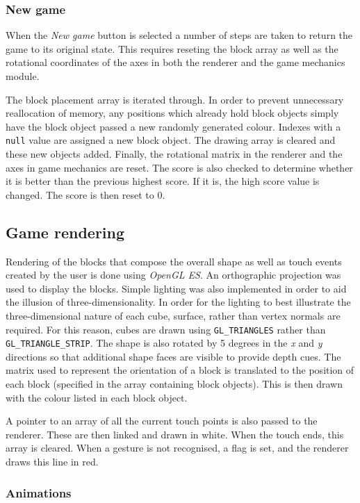 \subsubsection{New game}
When the \emph{New game} button is selected a number of steps are taken to return the game to its original state. This requires reseting the block array as well as the rotational coordinates of the axes in both the renderer and the game mechanics module.

The block placement array is iterated through. In order to prevent unnecessary reallocation of memory, any positions which already hold block objects simply have the block object passed a new randomly generated colour. Indexes with a \texttt{null} value are assigned a new block object. The drawing array is cleared and these new objects added. Finally, the rotational matrix in the renderer and the axes in game mechanics are reset. The score is also checked to determine whether it is better than the previous highest score. If it is, the high score value is changed. The score is then reset to 0. 


\subsection{Game rendering}
Rendering of the blocks that compose the overall shape as well as touch events created by the user is done using \emph{OpenGL ES}. An orthographic projection was used to display the blocks. Simple lighting was also implemented in order to aid the illusion of three-dimensionality. In order for the lighting to best illustrate the three-dimensional nature of each cube, surface, rather than vertex normals are required. For this reason, cubes are drawn using \texttt{GL\_TRIANGLES} rather than \texttt{GL\_TRIANGLE\_STRIP}. The shape is also rotated by 5 degrees in the \emph{x} and \emph{y} directions so that additional shape faces are visible to provide depth cues. The matrix used to represent the orientation of a block is translated to the position of each block (specified in the array containing block objects). This is then drawn with the colour listed in each block object. 

A pointer to an array of all the current touch points is also passed to the renderer. These are then linked and drawn in white. When the touch ends, this array is cleared. When a gesture is not recognised, a flag is set, and the renderer draws this line in red.

\subsubsection{Animations}

